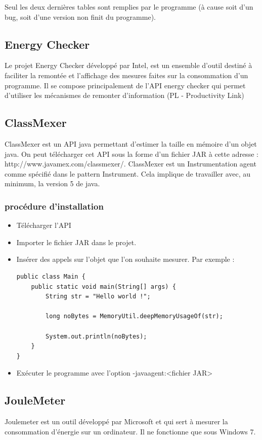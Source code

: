 \documentclass[a4paper, 11pt]{report}
\begin{document}
Seul les deux dernières tables sont remplies par le programme (à cause soit d’un bug, soit d’une version non finit du programme).

\subsection{Energy Checker}
Le projet Energy Checker développé par Intel, est un ensemble d’outil destiné à faciliter la remontée et l’affichage des mesures faites sur la consommation d’un programme. Il se compose principalement de l’API energy checker qui permet d’utiliser les mécanismes de remonter d’information (PL - Productivity Link)

\subsection{ClassMexer}
ClassMexer est un API java permettant d’estimer la taille en mémoire d’un objet java. On peut télécharger cet API sous la forme d’un fichier JAR à cette adresse : http://www.javamex.com/classmexer/. ClassMexer est un Instrumentation agent comme spécifié dans le pattern Instrument. Cela implique de travailler avec, au minimum, la version 5 de java.

\subsubsection{procédure d'installation}
\begin{itemize}
	\item Télécharger l’API
	\item Importer le fichier JAR dans le projet.
	\item Insérer des appels sur l’objet que l’on souhaite mesurer. Par exemple :
\begin{verbatim}
public class Main {
	public static void main(String[] args) {
		String str = "Hello world !";
		
		long noBytes = MemoryUtil.deepMemoryUsageOf(str);
		
		System.out.println(noBytes);
	}
}
\end{verbatim}
	\item Exécuter le programme avec l’option -javaagent:<fichier JAR>
\end{itemize}

\subsection{JouleMeter}
Joulemeter est un outil développé par Microsoft et qui sert à mesurer la consommation d’énergie sur un ordinateur. Il ne fonctionne que sous Windows 7.
\end{document}
